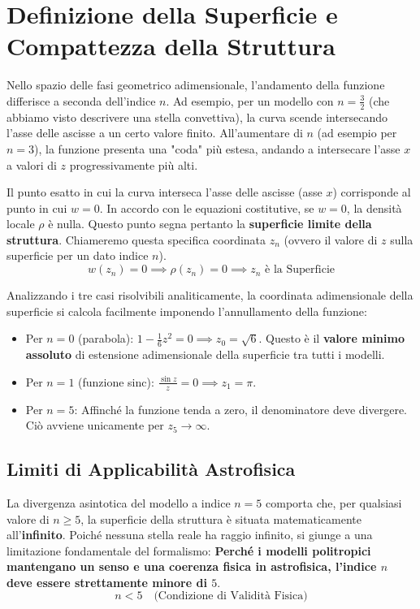 \section{Definizione della Superficie e Compattezza della Struttura}

Nello spazio delle fasi geometrico adimensionale, l'andamento della funzione differisce a seconda dell'indice $n$.
Ad esempio, per un modello con $n = \frac{3}{2}$ (che abbiamo visto descrivere una stella convettiva), la curva scende intersecando l'asse delle ascisse a un certo valore finito. All'aumentare di $n$ (ad esempio per $n = 3$), la funzione presenta una "coda" più estesa, andando a intersecare l'asse $x$ a valori di $z$ progressivamente più alti.

Il punto esatto in cui la curva interseca l'asse delle ascisse (asse $x$) corrisponde al punto in cui $w = 0$. In accordo con le equazioni costitutive, se $w = 0$, la densità locale $\rho$ è nulla. Questo punto segna pertanto la \textbf{superficie limite della struttura}.
Chiameremo questa specifica coordinata $z_n$ (ovvero il valore di $z$ sulla superficie per un dato indice $n$).
\begin{equation}
w(z_n) = 0 \implies \rho(z_n) = 0 \implies z_n \text{ è la Superficie}
\end{equation}

Analizzando i tre casi risolvibili analiticamente, la coordinata adimensionale della superficie si calcola facilmente imponendo l'annullamento della funzione:
\begin{itemize}
\item Per \textbf{$n = 0$} (parabola): $1 - \frac{1}{6} z^2 = 0 \implies z_0 = \sqrt{6}$. Questo è il \textbf{valore minimo assoluto} di estensione adimensionale della superficie tra tutti i modelli.
\item Per \textbf{$n = 1$} (funzione sinc): $\frac{\sin z}{z} = 0 \implies z_1 = \pi$.
\item Per \textbf{$n = 5$}: Affinché la funzione tenda a zero, il denominatore deve divergere. Ciò avviene unicamente per \textbf{$z_5 \to \infty$}.
\end{itemize}

\subsection{Limiti di Applicabilità Astrofisica}

La divergenza asintotica del modello a indice $n=5$ comporta che, per qualsiasi valore di $n \geq 5$, la superficie della struttura è situata matematicamente all'\textbf{infinito}. Poiché nessuna stella reale ha raggio infinito, si giunge a una limitazione fondamentale del formalismo:
\textbf{Perché i modelli politropici mantengano un senso e una coerenza fisica in astrofisica, l'indice $n$ deve essere strettamente minore di $5$}.
\begin{equation}
n < 5 \quad \text{(Condizione di Validità Fisica)}
\end{equation}

